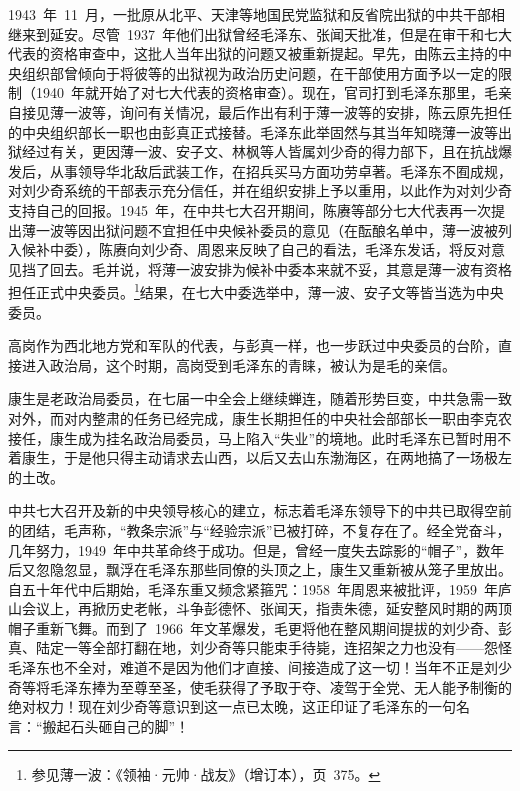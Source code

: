 1943~年~11~月，一批原从北平、天津等地国民党监狱和反省院出狱的中共干部相继来到延安。尽管~1937~年他们出狱曾经毛泽东、张闻天批准，但是在审干和七大代表的资格审查中，这批人当年出狱的问题又被重新提起。早先，由陈云主持的中央组织部曾倾向于将彼等的出狱视为政治历史问题，在干部使用方面予以一定的限制（1940~年就开始了对七大代表的资格审查）。现在，官司打到毛泽东那里，毛亲自接见薄一波等，询问有关情况，最后作出有利于薄一波等的安排，陈云原先担任的中央组织部长一职也由彭真正式接替。毛泽东此举固然与其当年知晓薄一波等出狱经过有关，更因薄一波、安子文、林枫等人皆属刘少奇的得力部下，且在抗战爆发后，从事领导华北敌后武装工作，在招兵买马方面功劳卓著。毛泽东不囿成规，对刘少奇系统的干部表示充分信任，并在组织安排上予以重用，以此作为对刘少奇支持自己的回报。1945~年，在中共七大召开期间，陈赓等部分七大代表再一次提出薄一波等因出狱问题不宜担任中央候补委员的意见（在酝酿名单中，薄一波被列入候补中委），陈赓向刘少奇、周恩来反映了自己的看法，毛泽东发话，将反对意见挡了回去。毛并说，将薄一波安排为候补中委本来就不妥，其意是薄一波有资格担任正式中央委员。\footnote{参见薄一波：《领袖·元帅·战友》（增订本），页~375。}结果，在七大中委选举中，薄一波、安子文等皆当选为中央委员。

高岗作为西北地方党和军队的代表，与彭真一样，也一步跃过中央委员的台阶，直接进入政治局，这个时期，高岗受到毛泽东的青睐，被认为是毛的亲信。

康生是老政治局委员，在七届一中全会上继续蝉连，随着形势巨变，中共急需一致对外，而对内整肃的任务已经完成，康生长期担任的中央社会部部长一职由李克农接任，康生成为挂名政治局委员，马上陷入“失业”的境地。此时毛泽东已暂时用不着康生，于是他只得主动请求去山西，以后又去山东渤海区，在两地搞了一场极左的土改。

中共七大召开及新的中央领导核心的建立，标志着毛泽东领导下的中共已取得空前的团结，毛声称，“教条宗派”与“经验宗派”已被打碎，不复存在了。经全党奋斗，几年努力，1949~年中共革命终于成功。但是，曾经一度失去踪影的“帽子”，数年后又忽隐忽显，飘浮在毛泽东那些同僚的头顶之上，康生又重新被从笼子里放出。自五十年代中后期始，毛泽东重又频念紧箍咒：1958~年周恩来被批评，1959~年庐山会议上，再掀历史老帐，斗争彭德怀、张闻天，指责朱德，延安整风时期的两顶帽子重新飞舞。而到了~1966~年文革爆发，毛更将他在整风期间提拔的刘少奇、彭真、陆定一等全部打翻在地，刘少奇等只能束手待毙，连招架之力也没有——怨怪毛泽东也不全对，难道不是因为他们才直接、间接造成了这一切！当年不正是刘少奇等将毛泽东捧为至尊至圣，使毛获得了予取于夺、凌驾于全党、无人能予制衡的绝对权力！现在刘少奇等意识到这一点已太晚，这正印证了毛泽东的一句名言：“搬起石头砸自己的脚”！